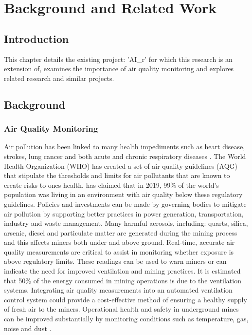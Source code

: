 \documentclass[a4paper,twoside,12pt]{report}
\begin{document}
\chapter{Background and Related Work}

\section{Introduction}
This chapter details the existing project: 'AI\_r' for which this research is an extension of, examines the importance of air quality monitoring and explores related research and similar projects.

\section{Background}
\subsection{Air Quality Monitoring}
 Air pollution has been linked to many health impediments such as heart disease, strokes, lung cancer and both acute and chronic respiratory diseases \citep{WHO_2022}. The World Health Organization (WHO) has created a set of air quality guidelines (AQG) that stipulate the thresholds and limits for air pollutants that are known to create risks to ones health. \cite{WHO_2022} has claimed that in 2019, 99\% of the world's population was living in an environment with air quality below these regulatory guidelines. Policies and investments can be made by governing bodies to mitigate air pollution by supporting better practices in power generation, transportation, industry and waste management.
 \newline \newline
Many harmful aerosols, including: quarts, silica, arsenic, diesel and particulate matter are generated during the mining process and this affects miners both under and above ground\citep{Hercus_2022}. Real-time, accurate air quality measurements are critical to assist in monitoring whether exposure is above regulatory limits. These readings can be used to warn miners or can indicate the need for improved ventilation and mining practices. It is estimated that 50\% of the energy consumed in mining operations is due to the ventilation systems\citep{Hercus_2022}. Integrating air quality measurements into an automated ventilation control system could provide a cost-effective method of ensuring a healthy supply of fresh air to the miners. Operational health and safety in underground mines can be improved substantially by monitoring conditions such as temperature, gas, noise and dust \citep{Sadeghi2022ApplicationsMines}.
\end{document}
